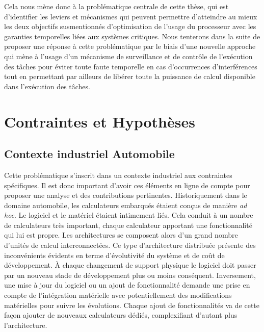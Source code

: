 \documentclass[french, a4paper, 11pt, twoside, pdftex]{StyleThese}
\begin{document}
		Cela nous mène donc à la problématique centrale de cette thèse, qui est d'identifier les leviers et mécanismes qui peuvent permettre d'atteindre au mieux les deux objectifs susmentionnés d'optimisation de l'usage du processeur avec les garanties temporelles liées aux systèmes critiques. 
		Nous tenterons dans la suite de proposer une réponse à cette problématique par le biais d'une nouvelle approche qui mène à l'usage d'un mécanisme de surveillance et de contrôle de l'exécution des tâches pour éviter toute faute temporelle en cas d'occurrences d'interférences tout en permettant par ailleurs de libérer toute la puissance de calcul disponible dans l'exécution des tâches.
	

\section{Contraintes et Hypothèses}
		
	\subsection{Contexte industriel Automobile}
		Cette problématique s'inscrit dans un contexte industriel aux contraintes spécifiques. Il est donc important d'avoir ces éléments en ligne de compte pour proposer une analyse et des contributions pertinentes. Historiquement dans le domaine automobile, les calculateurs embarqués étaient conçus de manière \emph{ad hoc}. Le logiciel et le matériel étaient intimement liés. Cela conduit à un nombre de calculateurs très important, chaque calculateur apportant une fonctionnalité qui lui est propre. Les architectures se composent alors d'un grand nombre d'unités de calcul interconnectées. 
		Ce type d'architecture distribuée présente des inconvénients évidents en terme d'évolutivité du système et de coût de développement. À chaque changement de support physique le logiciel doit passer par un nouveau stade de développement plus ou moins conséquent. Inversement, une mise à jour du logiciel ou un ajout de fonctionnalité demande une prise en compte de l'intégration matérielle avec potentiellement des modifications matérielles pour suivre les évolutions. Chaque ajout de fonctionnalités va de cette façon ajouter de nouveaux calculateurs dédiés, complexifiant d'autant plus l'architecture.
		
\end{document}
